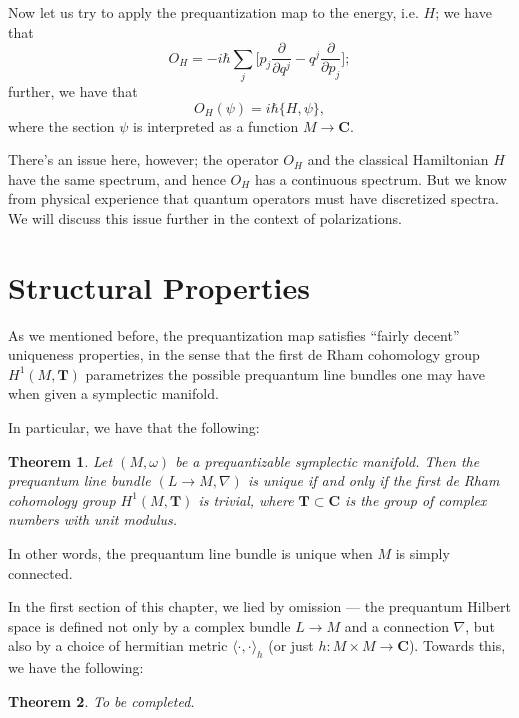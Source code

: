 \documentclass{tufte-handout}
\newtheorem{thrm}{Theorem}
\begin{document}
\begin{itemize}
Now let us try to apply the prequantization map to the energy, i.e. $H$; we have that
$$
O_H = -i\hbar\sum_j\biggl[p_j\frac{\partial}{\partial q^j} - q^j\frac{\partial}{\partial p_j} \biggr];
$$
further, we have that
$$
O_H(\psi) = i\hbar\{H,\psi\},
$$
where the section $\psi$ is interpreted as a function $M \to \mathbf{C}$.

There's an issue here, however; the operator $O_H$ and the classical Hamiltonian $H$ have the same spectrum, and hence $O_H$ has a continuous spectrum. But we know from physical experience that quantum operators must have discretized spectra. We will discuss this issue further in the context of polarizations.
\end{itemize}
\section{Structural Properties}

As we mentioned before, the prequantization map satisfies ``fairly decent'' uniqueness properties, in the sense that the first de Rham cohomology group $H^1(M,\mathbf{T})$ parametrizes the possible prequantum line bundles one may have when given a symplectic manifold.

In particular, we have that the following:
\begin{thrm}
Let $(M,\omega)$ be a prequantizable symplectic manifold. Then the prequantum line bundle $(L\to M, \nabla)$ is unique if and only if the first de Rham cohomology group $H^1(M,\mathbf{T})$ is trivial, where $\mathbf{T} \subset \mathbf{C}$ is the group of complex numbers with unit modulus.
\end{thrm}
In other words, the prequantum line bundle is unique when $M$ is simply connected.%

In the first section of this chapter, we lied by omission --- the prequantum Hilbert space is defined not only by a complex bundle $L \to M$ and a connection $\nabla$, but also by a choice of hermitian metric $\langle \cdot,\cdot \rangle_h$ (or just $h: M \times M \to \mathbf{C}$). Towards this, we have the following:
\begin{thrm}
\emph{To be completed.}%
\end{thrm}
\end{document}
